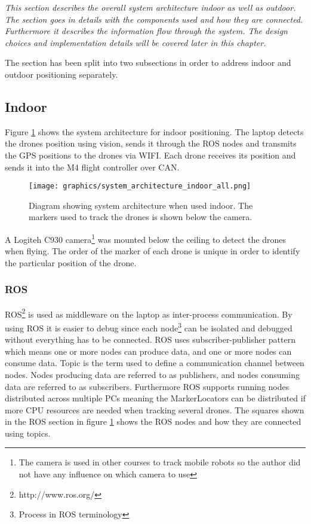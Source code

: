 \textit{This section describes the overall system architecture indoor as well as outdoor. The section goes in details with the components used and how they are connected. Furthermore it describes the information flow through the system. The design choices and implementation details will be covered later in this chapter.}

The section has been split into two subsections in order to address indoor and outdoor positioning separately.

\subsection{Indoor} \label{sec:system_architecture_indoor}
Figure \ref{fig:indoor_information_flow} shows the system architecture for indoor positioning. The laptop detects the drones position using vision, sends it through the ROS nodes and transmits the GPS positions to the drones via WIFI.
Each drone receives its position and sends it into the M4 flight controller over \ac{CAN}.
\begin{figure}[H]
    \center
    \texttt{[image: graphics/system\_architecture\_indoor\_all.png]}
    \caption{Diagram showing system architecture when used indoor. The markers used to track the drones is shown below the camera.}
    \label{fig:indoor_information_flow}
\end{figure} 

A Logiteh C930 camera\footnote{The camera is used in other courses to track mobile robots so the author did not have any influence on which camera to use} was mounted below the ceiling to detect the drones when flying. The order of the marker of each drone is unique in order to identify the particular position of the drone.


\subsubsection*{ROS}
\ac{ROS}\footnote{http://www.ros.org/} is used as middleware on the laptop as inter-process communication. By using ROS it is easier to debug since each node\footnote{Process in \ac{ROS} terminology} can be isolated and debugged without everything has to be connected. \ac{ROS} uses subscriber-publisher pattern which means one or more nodes can produce data, and one or more nodes can consume data. Topic is the term used to define a communication channel between nodes. Nodes producing data are referred to as publishers, and nodes consuming data are referred to as subscribers.
Furthermore \ac{ROS} supports running nodes distributed across multiple PCs meaning the MarkerLocators can be distributed if more CPU resources are needed when tracking several drones.
The squares shown in the \ac{ROS} section in figure \ref{fig:indoor_information_flow} shows the \ac{ROS} nodes and how they are connected using topics.


